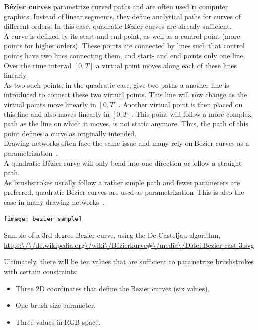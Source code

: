 \textbf{Bézier curves} parametrize curved paths and are often used in computer graphics.
Instead of linear segments, they define analytical paths for curves of different orders.
In this case, quadratic Bézier curves are already sufficient.\\
A curve is defined by its start and end point, as well as a control point (more points for higher orders).
These points are connected by lines such that control points have two lines connecting them, and start- and end points only one line.
Over the time interval $[0, T]$ a virtual point moves along each of these lines linearly.\\
As two such points, in the quadratic case, give two paths a another line is introduced to connect these two virtual points.
This line will now change as the virtual points move linearly in $[0, T]$.
Another virtual point is then placed on this line and also moves linearly in $[0, T]$.
This point will follow a more complex path as the line on which it moves, is not static anymore.
Thus, the path of this point defines a curve as originally intended.\\
Drawing networks often face the same issue and many rely on Bézier curves as a parametrization~\cite{SPIRAL, neuralpainters, learning2paint}.\\
A quadratic Bézier curve will only bend into one direction or follow a straight path.\\
As brushstrokes usually follow a rather simple path and fewer parameters are preferred, quadratic Bézier curves are used as parametrization.
This is also the case in many drawing networks~\cite{SPIRAL, neuralpainters, learning2paint}.
\begin{marginfigure}
    \texttt{[image: bezier\_sample]}
    \caption{Sample of a 3rd degree Bezier curve, using the De-Casteljau-algorithm, \url{https:\/\/de.wikipedia.org\/wiki\/Bézierkurve\#\/media\/Datei:Bezier-cast-3.svg}}
\end{marginfigure}

Ultimately, there will be ten values that are sufficient to parametrize brushstrokes with certain constraints:
\begin{itemize}
    \item Three 2D coordinates that define the Bezier curves (six values).
    \item One brush size parameter.
    \item Three values in RGB space.
\end{itemize}

